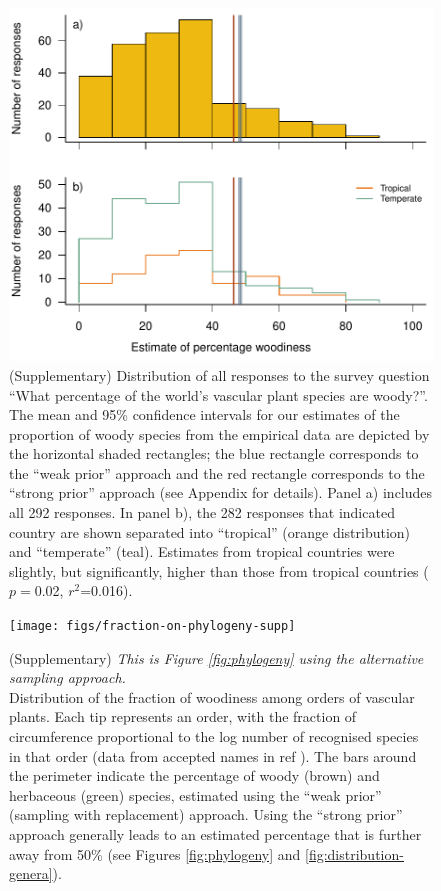 \documentclass[12pt]{article}
\begin{document}
\begin{figure}[p]
  \centering
  \includegraphics{figs/survey-distribution}
  \caption{(Supplementary) Distribution of all responses to the survey
    question ``What percentage of the world's vascular plant species
    are woody?''.
    The mean and 95\% confidence intervals for our estimates of the
    proportion of woody species from the empirical data are depicted
    by the horizontal shaded rectangles; the blue rectangle
    corresponds to the ``weak prior'' approach and the red rectangle
    corresponds to the ``strong prior'' approach (see Appendix for
    details).  
    Panel a) includes all 292 responses.  In panel b), the 282
    responses that indicated country are shown separated into
    ``tropical'' (orange distribution) and ``temperate'' (teal).
    Estimates from tropical countries were slightly, but
    significantly, higher than those from tropical countries
    ($p=$0.02, $r^2$=0.016).
  }

  \label{fig:survey-distribution}
\end{figure}

\begin{figure}[p]
  \centering
  \texttt{[image: figs/fraction-on-phylogeny-supp]}

  \caption{(Supplementary)
    \textit{This is Figure \ref{fig:phylogeny} using the alternative
      sampling approach.}\\
    Distribution of the fraction of woodiness among orders of vascular
    plants.  Each tip represents an order, with the fraction of
    circumference proportional to the log number of recognised species
    in that order (data from accepted names in ref
    \citep{ThePlantList}).  The bars around the perimeter indicate the
    percentage of woody (brown) and herbaceous (green) species,
    estimated using the ``weak prior'' (sampling with replacement)
    approach.  Using the ``strong prior'' approach generally leads to
    an estimated percentage that is further away from 50\% (see
    Figures \ref{fig:phylogeny} and \ref{fig:distribution-genera}).}
  \label{fig:phylogeny-supp}
\end{figure}
\end{document}
